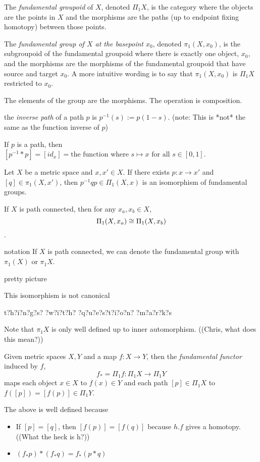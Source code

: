 \documentclass[11pt,leqno,oneside]{amsart}
\numberwithin{thm}{section}
\newcommand{\de}{\emph}
\begin{document}
\begin{defn}
  The \de{fundamental groupoid} of $X$, denoted $\Pi_1 X$, is the category where the objects are the points in $X$ and the morphisms are the paths (up to endpoint fixing homotopy) between those points.
\end{defn}
\begin{defn}
  The \de{fundamental group of $X$ at the basepoint $x_0$}, denoted $\pi_1(X, x_0)$, is the subgroupoid of the fundamental groupoid where there is exactly one object, $x_0$, and the morphisms are the morphisms of the fundamental groupoid that have source and target $x_0$.  A more intuitive wording is to say that $\pi_1(X, x_0)$ is $\Pi_1 X$ restricted to $x_0$.

  The elements of the group are the morphisms.  The operation is composition.
\end{defn}
\begin{defn}
  the \de{inverse path} of a path $p$ is $p^{-1}(s) := p(1-s)$.  (note: This is *not* the same as the function inverse of $p$)
\end{defn}
\begin{prop}
  If $p$ is a path, then $[p^{-1}*p] = [id_{x}] = \text{the function where $s \mapsto x$ for all $s \in [0,1]$}$.
\end{prop}

\begin{thm}[Hatcher 1.5]
Let $X$ be a metric space and $x,x' \in X$.  If there exists $p: x \to x'$ and $[q] \in \pi_1(X,x')$, then $p^{-1}qp \in \Pi_1(X,x)$ is an isomorphism of fundamental groups.
\end{thm}
\begin{thm}
  If $X$ is path connected, then for any $x_a, x_b \in X$, $$\Pi_1(X, x_a) \mathrel{\cong} \Pi_1(X, x_b)$$.

  notation
  If $X$ is path connected, we can denote the fundamental group with $\pi_1(X)$ or $\pi_1 X$.
\end{thm}
\begin{example}
  pretty picture

  This isomorphism is not canonical

  t?h?i?n?g?s? ?w?i?t?h? ?q?u?e?s?t?i?o?n? ?m?a?r?k?s

  Note that $\pi_1 X$ is only well defined up to inner automorphism.  ((Chris, what does this mean?))
\end{example}
\begin{defn}
  Given metric spaces $X, Y$ and a map $f: X \to Y$, then the \de{fundamental functor} induced by $f$, $$f_* = \Pi_1 f : \Pi_1 X \to \Pi_1 Y$$ maps each object $x \in X$ to $f(x) \in Y$ and each path $[p] \in \Pi_1 X$ to $f([p]) = [f(p)] \in \Pi_1 Y$.
\end{defn}
\begin{prop}
  The above is well defined because
  \begin{itemize}
    \item If $[p]=[q]$, then $[f(p)] = [f(q)]$ because $h.f$ gives a homotopy.  ((What the heck is h?))
    \item $(f_*p)*(f_*q) = f_*(p*q)$
  \end{itemize}
\end{prop}
\end{document}
